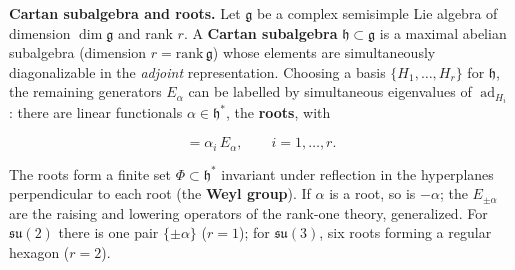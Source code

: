 \medskip\noindent\textbf{Cartan subalgebra and roots.} Let $\mathfrak g$ be a complex semisimple Lie algebra of dimension $\dim\mathfrak g$ and rank $r$. A \textbf{Cartan subalgebra} $\mathfrak h\subset\mathfrak g$ is a maximal abelian subalgebra (dimension $r=\mathrm{rank}\,\mathfrak g$) whose elements are simultaneously diagonalizable in the \emph{adjoint} representation. Choosing a basis $\{H_{1},\ldots,H_{r}\}$ for $\mathfrak h$, the remaining generators $E_{\alpha}$ can be labelled by simultaneous eigenvalues of $\operatorname{ad}_{H_{i}}$: there are linear functionals $\alpha\in\mathfrak h^{*}$, the \textbf{roots}, with
\begin{linenomath}
\begin{equation}
[H_{i},E_{\alpha}]=\alpha_{i}\,E_{\alpha},\qquad i=1,\ldots,r.
\label{eq:root-definition}
\end{equation}
\end{linenomath}
The roots form a finite set $\Phi\subset\mathfrak h^{*}$ invariant under reflection in the hyperplanes perpendicular to each root (the \textbf{Weyl group}). If $\alpha$ is a root, so is $-\alpha$; the $E_{\pm\alpha}$ are the raising and lowering operators of the rank-one theory, generalized. For $\mathfrak{su}(2)$ there is one pair $\{\pm\alpha\}$ ($r=1$); for $\mathfrak{su}(3)$, six roots forming a regular hexagon ($r=2$).

